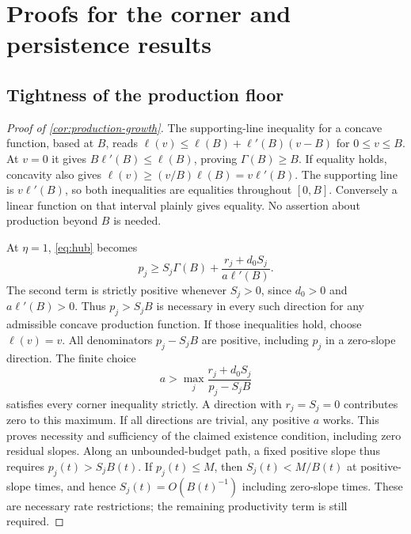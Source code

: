 \section{Proofs for the corner and persistence results}
\label{app:stage1-proofs}

\subsection{Tightness of the production floor}
\label{app:floor-proof}
\begin{proof}[Proof of \cref{cor:production-growth}]
The supporting-line inequality for a concave function, based at $B$,
reads $\ell(v)\leq\ell(B)+\ell'(B)(v-B)$ for $0\leq v\leq B$.
At $v=0$ it gives $B\ell'(B)\leq\ell(B)$, proving $\Gamma(B)\geq B$.
If equality holds, concavity also gives
$\ell(v)\geq(v/B)\ell(B)=v\ell'(B)$. The supporting line is
$v\ell'(B)$, so both inequalities are equalities throughout $[0,B]$.
Conversely a linear function on that interval plainly gives equality.
No assertion about production beyond $B$ is needed.

At $\eta=1$, \cref{eq:hub} becomes
\[
 p_j\geq S_j\Gamma(B)+\frac{r_j+d_0S_j}{a\ell'(B)}.
\]
The second term is strictly positive whenever $S_j>0$, since $d_0>0$
and $a\ell'(B)>0$. Thus $p_j>S_jB$ is necessary in every such
direction for any admissible concave production function.
If those inequalities hold, choose $\ell(v)=v$.
All denominators $p_j-S_jB$ are positive, including $p_j$ in a
zero-slope direction. The finite choice
\[
 a>\max_j\frac{r_j+d_0S_j}{p_j-S_jB}
\]
satisfies every corner inequality strictly. A direction with
$r_j=S_j=0$ contributes zero to this maximum. If all directions are
trivial, any positive $a$ works. This proves necessity and sufficiency
of the claimed existence condition, including zero residual slopes.
Along an unbounded-budget path, a fixed positive slope thus requires
$p_j(t)>S_jB(t)$. If $p_j(t)\leq M$, then
$S_j(t)<M/B(t)$ at positive-slope times, and hence
$S_j(t)=O(B(t)^{-1})$ including zero-slope times. These are necessary
rate restrictions; the remaining productivity term is still required.
\end{proof}

